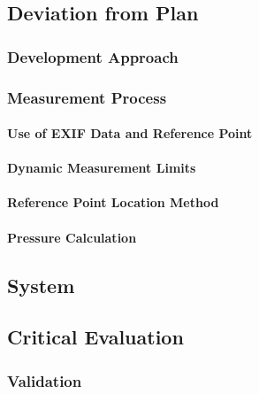 \subsection{Deviation from Plan}
	\subsubsection{Development Approach}
	\subsubsection{Measurement Process}
		\paragraph{Use of EXIF Data and Reference Point}
		\paragraph{Dynamic Measurement Limits}
		\paragraph{Reference Point Location Method}
		\paragraph{Pressure Calculation}
\subsection{System}
\subsection{Critical Evaluation}
	\subsubsection{Validation}
